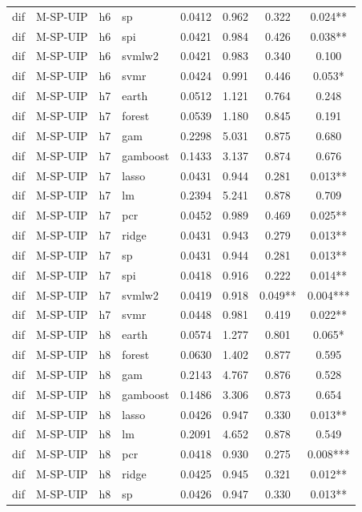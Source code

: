 \begin{ThreePartTable}
\begin{longtable}[t]{llclcccc}
dif & M-SP-UIP & h6 & sp & 0.0412 & 0.962 & 0.322 & 0.024**\\
dif & M-SP-UIP & h6 & spi & 0.0421 & 0.984 & 0.426 & 0.038**\\
dif & M-SP-UIP & h6 & svmlw2 & 0.0421 & 0.983 & 0.340 & 0.100\\
dif & M-SP-UIP & h6 & svmr & 0.0424 & 0.991 & 0.446 & 0.053*\\
\addlinespace
dif & M-SP-UIP & h7 & earth & 0.0512 & 1.121 & 0.764 & 0.248\\
dif & M-SP-UIP & h7 & forest & 0.0539 & 1.180 & 0.845 & 0.191\\
dif & M-SP-UIP & h7 & gam & 0.2298 & 5.031 & 0.875 & 0.680\\
dif & M-SP-UIP & h7 & gamboost & 0.1433 & 3.137 & 0.874 & 0.676\\
dif & M-SP-UIP & h7 & lasso & 0.0431 & 0.944 & 0.281 & 0.013**\\
dif & M-SP-UIP & h7 & lm & 0.2394 & 5.241 & 0.878 & 0.709\\
dif & M-SP-UIP & h7 & pcr & 0.0452 & 0.989 & 0.469 & 0.025**\\
dif & M-SP-UIP & h7 & ridge & 0.0431 & 0.943 & 0.279 & 0.013**\\
dif & M-SP-UIP & h7 & sp & 0.0431 & 0.944 & 0.281 & 0.013**\\
dif & M-SP-UIP & h7 & spi & 0.0418 & 0.916 & 0.222 & 0.014**\\
dif & M-SP-UIP & h7 & svmlw2 & 0.0419 & 0.918 & 0.049** & 0.004***\\
dif & M-SP-UIP & h7 & svmr & 0.0448 & 0.981 & 0.419 & 0.022**\\
\addlinespace
dif & M-SP-UIP & h8 & earth & 0.0574 & 1.277 & 0.801 & 0.065*\\
dif & M-SP-UIP & h8 & forest & 0.0630 & 1.402 & 0.877 & 0.595\\
dif & M-SP-UIP & h8 & gam & 0.2143 & 4.767 & 0.876 & 0.528\\
dif & M-SP-UIP & h8 & gamboost & 0.1486 & 3.306 & 0.873 & 0.654\\
dif & M-SP-UIP & h8 & lasso & 0.0426 & 0.947 & 0.330 & 0.013**\\
dif & M-SP-UIP & h8 & lm & 0.2091 & 4.652 & 0.878 & 0.549\\
dif & M-SP-UIP & h8 & pcr & 0.0418 & 0.930 & 0.275 & 0.008***\\
dif & M-SP-UIP & h8 & ridge & 0.0425 & 0.945 & 0.321 & 0.012**\\
dif & M-SP-UIP & h8 & sp & 0.0426 & 0.947 & 0.330 & 0.013**\\

\end{longtable}
\end{ThreePartTable}
